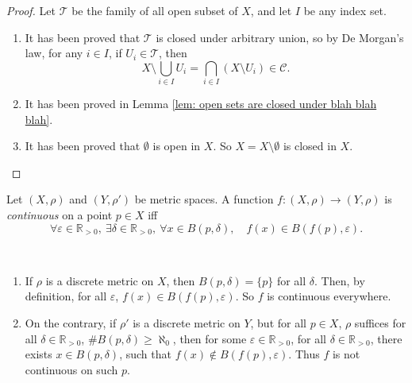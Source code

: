 \begin{proof}
	Let $\mathcal T$ be the family of all open subset of $X$, and let $I$ be any index set.
	\begin{enumerate}
		\item It has been proved that $\mathcal T$ is closed under arbitrary union, so by De Morgan's law, for any $i \in I$, if $U_i \in \mathcal T$, then
			$$
			X \setminus \bigcup_{i \in I} U_i = \bigcap_{i \in I} (X \setminus U_i) \in \mathcal C.
			$$
		\item It has been proved in Lemma \ref{lem: open sets are closed under blah blah blah}.
		\item It has been proved that $\emptyset$ is open in $X$. So $X = X \setminus \emptyset$ is closed in $X$.
	\end{enumerate}
\end{proof}



\begin{definition}
	\label{def: continuous function}
	Let $(X, \rho)$ and $(Y, \rho')$ be metric spaces. A function $f: (X, \rho) \to (Y, \rho)$ is \textit{continuous} on a point $p \in X$ iff
	$$
	\forall \varepsilon \in \mathbb R_{> 0}, \ \exists \delta \in \mathbb R_{> 0}, \ \forall x \in B(p, \delta), \quad f(x) \in B(f(p), \varepsilon).
	$$
\end{definition}


\begin{note} \
	\begin{enumerate}
		\item If $\rho$ is a discrete metric on $X$, then $B(p, \delta) = \{p\}$ for all $\delta$. Then, by definition, for all $\varepsilon$, $f(x) \in B(f(p), \varepsilon)$. So $f$ is continuous everywhere.
		
		\item On the contrary, if $\rho'$ is a discrete metric on $Y$, but for all $p\in X$, $\rho$ suffices for all $\delta \in \mathbb R_{> 0}$, $\# B(p, \delta) \ge \aleph_0$, then for some $\varepsilon \in \mathbb R_{>0}$, for all $\delta \in \mathbb R_{> 0}$, there exists $x \in B(p, \delta)$, such that $f(x) \notin B(f(p), \varepsilon)$. Thus $f$ is not continuous on such $p$.
	\end{enumerate}
\end{note}


